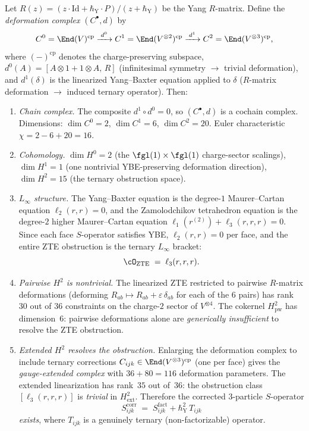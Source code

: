 \begin{proposition}
\label{prop:zte-deformation-cohomology}
Let $R(z) = (z \cdot \mathrm{Id} + \hbar_{\mathrm{Y}} \cdot P)/(z + \hbar_{\mathrm{Y}})$ be the Yang $R$-matrix. Define the \emph{deformation complex} $(C^\bullet, d)$ by
\[
 C^0 = \End(V)^{\mathrm{cp}} \xrightarrow{\; d^0 \;} C^1 = \End(V^{\otimes 2})^{\mathrm{cp}} \xrightarrow{\; d^1 \;} C^2 = \End(V^{\otimes 3})^{\mathrm{cp}},
\]
where $(-)^{\mathrm{cp}}$ denotes the charge-preserving subspace, $d^0(A) = [A \otimes 1 + 1 \otimes A,\, R]$ (infinitesimal symmetry $\to$ trivial deformation), and $d^1(\delta)$ is the linearized Yang--Baxter equation applied to $\delta$ ($R$-matrix deformation $\to$ induced ternary operator). Then:
\begin{enumerate}[label=\textup{(\roman*)}]
 \item \emph{Chain complex.} The composite $d^1 \circ d^0 = 0$, so $(C^\bullet, d)$ is a cochain complex. Dimensions: $\dim C^0 = 2$, $\dim C^1 = 6$, $\dim C^2 = 20$. Euler characteristic $\chi = 2 - 6 + 20 = 16$.

 \item \emph{Cohomology.} $\dim H^0 = 2$ (the $\fgl(1) \times \fgl(1)$ charge-sector scalings), $\dim H^1 = 1$ (one nontrivial YBE-preserving deformation direction), $\dim H^2 = 15$ (the ternary obstruction space).

 \item \emph{$L_\infty$ structure.} The Yang--Baxter equation is the degree-$1$ Maurer--Cartan equation $\ell_2(r,r) = 0$, and the Zamolodchikov tetrahedron equation is the degree-$2$ higher Maurer--Cartan equation $\ell_1(r^{(2)}) + \ell_3(r,r,r) = 0$. Since each face $S$-operator satisfies YBE, $\ell_2(r,r) = 0$ per face, and the entire ZTE obstruction is the ternary $L_\infty$ bracket:
 \[
 \cO_{\mathrm{ZTE}} \;=\; \ell_3(r,r,r).
 \]

 \item \emph{Pairwise $H^2$ is nontrivial.} The linearized ZTE restricted to pairwise $R$-matrix deformations (deforming $R_{ab} \mapsto R_{ab} + \varepsilon \, \delta_{ab}$ for each of the $6$ pairs) has rank~$30$ out of $36$ constraints on the charge-$2$ sector of $V^{\otimes 4}$. The cokernel $H^2_{\mathrm{pw}}$ has dimension~$6$: pairwise deformations alone are \emph{generically insufficient} to resolve the ZTE obstruction.

 \item \emph{Extended $H^2$ resolves the obstruction.} Enlarging the deformation complex to include ternary corrections $C_{ijk} \in \End(V^{\otimes 3})^{\mathrm{cp}}$ (one per face) gives the \emph{gauge-extended complex} with $36 + 80 = 116$ deformation parameters. The extended linearization has rank~$35$ out of~$36$: the obstruction class $[\ell_3(r,r,r)]$ is \emph{trivial} in $H^2_{\mathrm{ext}}$. Therefore the corrected $3$-particle $S$-operator
 \[
 S^{\mathrm{corr}}_{ijk} \;=\; S^{\mathrm{fact}}_{ijk} + \hbar_{\mathrm{Y}}^2 \, T_{ijk}
 \]
 \emph{exists}, where $T_{ijk}$ is a genuinely ternary (non-factorizable) operator.


\end{enumerate}
\end{proposition}
